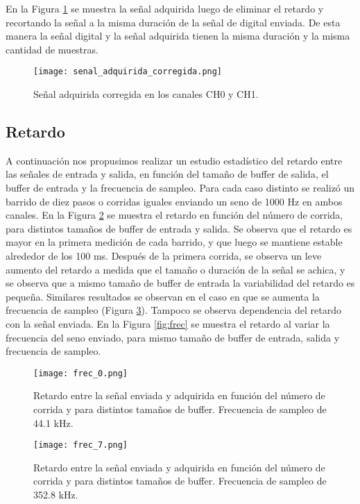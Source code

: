 \documentclass[a4paper, 11pt]{article}
\begin{document}
En la Figura \ref{fig:senal_adquirida_corregida} se muestra la señal adquirida luego de eliminar el retardo y recortando la señal a la misma duración de la señal de digital enviada. De esta manera la señal digital y la señal adquirida tienen la misma duración y la misma cantidad de muestras.
 
\begin{figure} [H]
\centering
\texttt{[image: senal\_adquirida\_corregida.png]}
\caption{Señal adquirida corregida en los canales CH0 y CH1. \label{fig:senal_adquirida_corregida}}
\end{figure} 
 

\subsection*{Retardo}
A continuación nos propusimos realizar un estudio estadístico del retardo entre las señales de entrada y salida, en función del tamaño de buffer de salida, el buffer de entrada y la frecuencia de sampleo. Para cada caso distinto se realizó un barrido de diez pasos o corridas iguales enviando un seno de 1000 Hz en ambos canales. En la Figura \ref{fig:frec_0} se muestra el retardo en función del número de corrida, para distintos tamaños de buffer de entrada y salida. Se observa que el retardo es mayor en la primera medición de cada barrido, y que luego se mantiene estable alrededor de los 100 ms. Después de la primera corrida, se observa un leve aumento del retardo a medida que el tamaño o duración de la señal se achica, y se observa que a mismo tamaño de buffer de entrada la variabilidad del retardo es pequeña. Similares resultados se observan en el caso en que se aumenta la frecuencia de sampleo (Figura \ref{fig:frec_7}). 
Tampoco se observa dependencia del retardo con la señal enviada. En la Figura \ref{fig:frec} se muestra el retardo al variar la frecuencia del seno enviado, para mismo tamaño de buffer de entrada, salida y frecuencia de sampleo.
 
\begin{figure} [H]
\centering
\texttt{[image: frec\_0.png]}
\caption{Retardo entre la señal enviada y adquirida en función del número de corrida y para distintos tamaños de buffer. Frecuencia de sampleo de 44.1 kHz. \label{fig:frec_0}}
\end{figure} 
 
\begin{figure} [H]
\centering
\texttt{[image: frec\_7.png]}
\caption{Retardo entre la señal enviada y adquirida en función del número de corrida y para distintos tamaños de buffer. Frecuencia de sampleo de 352.8 kHz.  \label{fig:frec_7}}
\end{figure} 
\end{document}
